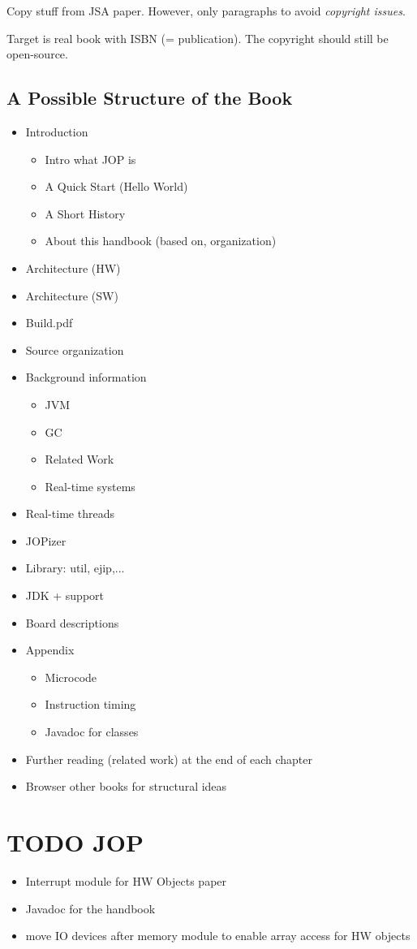 Copy stuff from JSA paper. However, only paragraphs to avoid
\emph{copyright issues}.

Target is real book with ISBN (= publication). The copyright should
still be open-source.

\subsection{A Possible Structure of the Book}

\begin{itemize}
    \item Introduction
    \begin{itemize}
        \item Intro what JOP is
        \item A Quick Start (Hello World)
        \item A Short History
        \item About this handbook (based on, organization)
    \end{itemize}
    \item Architecture (HW)
    \item Architecture (SW)
    \item Build.pdf
    \item Source organization
    \item Background information
    \begin{itemize}
        \item JVM
        \item GC
        \item Related Work
        \item Real-time systems
    \end{itemize}
    \item Real-time threads
    \item JOPizer
    \item Library: util, ejip,...
    \item JDK + support
    \item Board descriptions
    \item Appendix
    \begin{itemize}
        \item Microcode
        \item Instruction timing
        \item Javadoc for classes
    \end{itemize}
    \item Further reading (related work) at the end of each chapter
    \item Browser other books for structural ideas
\end{itemize}

\section{TODO JOP}

\begin{itemize}
    \item Interrupt module for HW Objects paper
    \item Javadoc for the handbook
    \item move IO devices after memory module to enable array access
    for HW objects
\end{itemize}
